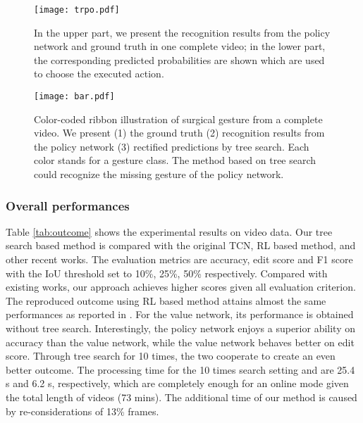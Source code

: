 \documentclass[letterpaper, 10 pt, conference]{ieeeconf}
\begin{document}
\begin{figure}[t]
\centering
	\texttt{[image: trpo.pdf]}
	\vspace{-4mm}
	\caption{In the upper part, we present the recognition results from the policy network and ground truth in one complete video; in the lower part, the corresponding predicted probabilities are shown which are used to choose the executed action.}
	\label{prediction_example}
	\vspace{-3mm}
\end{figure} 
 
\begin{figure}[b]
	\vspace{-2mm}
\centering
	\texttt{[image: bar.pdf]}
\caption{Color-coded ribbon illustration of surgical gesture from a complete video. We present (1) the ground truth (2) recognition results from the policy network (3) rectified predictions by tree search. Each color stands for a gesture class. The method based on tree search could recognize the missing gesture of the policy network.}
	\label{bar_example}
\end{figure} 
 
\subsubsection{Overall performances}
Table \ref{tab:outcome} shows the experimental results on video data. Our tree search based method is compared with the original TCN, RL based method, and other recent works. The evaluation metrics are accuracy, edit score and F1 score with the IoU threshold set to 10\%, 25\%, 50\% respectively. Compared with existing works, our approach achieves higher scores given all evaluation criterion. The reproduced outcome using RL based method attains almost the same performances as reported in \cite{liu2018deep}. For the value network, its performance is obtained without tree search. Interestingly, the policy network enjoys a superior ability on accuracy than the value network, while the value network behaves better on edit score. Through tree search for 10 times, the two cooperate to create an even better outcome. The processing time for the 10 times search setting and \cite{liu2018deep} are 25.4 s and 6.2 s, respectively, which are completely enough for an online mode given the total length of videos (73 mins). The additional time of our method is caused by re-considerations of 13\%  frames.
\end{document}
